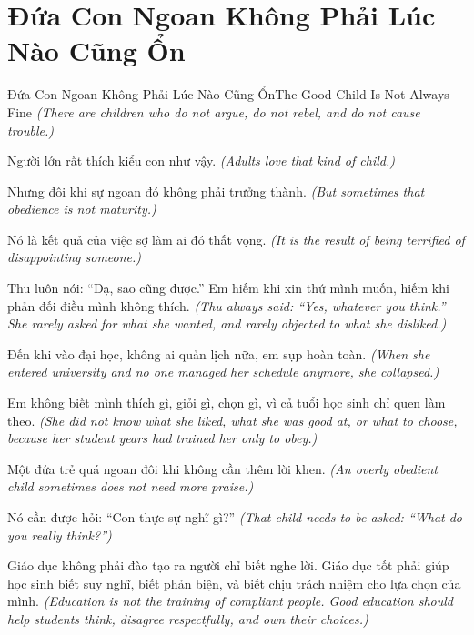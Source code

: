 \section{Đứa Con Ngoan Không Phải Lúc Nào Cũng Ổn}
\begin{truyen}{Đứa Con Ngoan Không Phải Lúc Nào Cũng Ổn}{The Good Child Is Not Always Fine}
\textit{(There are children who do not argue, do not rebel, and do not cause trouble.)}

Người lớn rất thích kiểu con như vậy.
\textit{(Adults love that kind of child.)}

Nhưng đôi khi sự ngoan đó không phải trưởng thành.
\textit{(But sometimes that obedience is not maturity.)}

Nó là kết quả của việc sợ làm ai đó thất vọng.
\textit{(It is the result of being terrified of disappointing someone.)}

Thu luôn nói: ``Dạ, sao cũng được.'' Em hiếm khi xin thứ mình muốn, hiếm khi phản đối điều mình không thích.
\textit{(Thu always said: ``Yes, whatever you think.'' She rarely asked for what she wanted, and rarely objected to what she disliked.)}

Đến khi vào đại học, không ai quản lịch nữa, em sụp hoàn toàn.
\textit{(When she entered university and no one managed her schedule anymore, she collapsed.)}

Em không biết mình thích gì, giỏi gì, chọn gì, vì cả tuổi học sinh chỉ quen làm theo.
\textit{(She did not know what she liked, what she was good at, or what to choose, because her student years had trained her only to obey.)}

Một đứa trẻ quá ngoan đôi khi không cần thêm lời khen.
\textit{(An overly obedient child sometimes does not need more praise.)}

Nó cần được hỏi: ``Con thực sự nghĩ gì?''
\textit{(That child needs to be asked: ``What do you really think?'')}

\end{truyen}

\begin{baihoc}
Giáo dục không phải đào tạo ra người chỉ biết nghe lời. Giáo dục tốt phải giúp học sinh biết suy nghĩ, biết phản biện, và biết chịu trách nhiệm cho lựa chọn của mình.
\textit{(Education is not the training of compliant people. Good education should help students think, disagree respectfully, and own their choices.)}
\end{baihoc}

